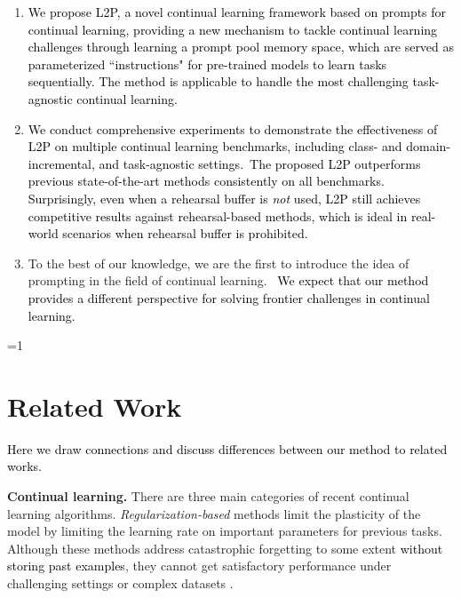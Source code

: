 \documentclass[10pt,twocolumn,letterpaper]{article}
\newcommand{\zizhaoz}[1]{\textcolor{black}{#1}}
\newcommand{\zifeng}[1]{\textcolor{black}{#1}}
\newcommand{\methodabbr}{L2P\xspace}
\newcounter{alphasect}
\def\alphainsection{0}
\let\oldsection=\section
\def\section{%
  \ifnum\alphainsection=1%
    \addtocounter{alphasect}{1}
  \fi%
\oldsection}%
\begin{document}
\begin{enumerate}[leftmargin=0.7cm]
    
    \item \zifeng{We propose \methodabbr, a novel continual learning framework based on prompts for continual learning,} \zizhaoz{providing a new mechanism to tackle continual learning challenges through learning a prompt pool memory space, which are served as parameterized ``instructions" for pre-trained models to learn tasks sequentially. The method is applicable to handle the most challenging task-agnostic continual learning.}
    
    \item \zifeng{We conduct comprehensive experiments to demonstrate the effectiveness of \methodabbr on multiple continual learning benchmarks, including class- and domain-incremental, and task-agnostic settings.~The proposed \methodabbr outperforms previous state-of-the-art methods consistently on all benchmarks. 
    Surprisingly, even when a rehearsal buffer is \emph{not} used,  \methodabbr still achieves competitive results against rehearsal-based methods, which is ideal in real-world scenarios when rehearsal buffer is prohibited.
    }

    \item To the best of our knowledge, we are the first to introduce the idea of prompting in the field of continual learning.~\zizhaoz{%
    We expect that our method provides a different perspective for solving frontier challenges in continual learning. %
    }

\end{enumerate}




\section{Related Work}
\zizhaoz{Here we draw connections and discuss differences between our method to related works.}

\textbf{Continual learning.} There are three main categories of recent continual learning algorithms.
\emph{Regularization-based} methods \cite{kirkpatrick2017overcoming, zenke2017continual, li2017learning, aljundi2018memory} limit the plasticity of the model by limiting the learning rate on important parameters for previous tasks. 
Although these methods address catastrophic forgetting to some extent \zifeng{without storing past examples}, they cannot get satisfactory performance under challenging settings\cite{mai2021online} or complex datasets \cite{rebuffi2017icarl, wu2019large}.
\end{document}
